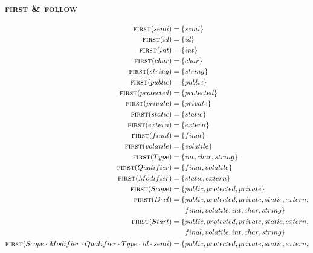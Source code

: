 \documentclass{report}
\newcommand{\Seq}{\cdot}
\newcommand{\FIRST}{\textsc{first}}
\newcommand{\FOLLOW}{\textsc{follow}}
\newcommand{\NT}[1]{{#1}}
\newcommand{\T}[1]{{#1}}
\begin{document}
    \subsubsection*{{\FIRST} \& {\FOLLOW}}
    \begin{equation*}
      \begin{aligned}
        \FIRST(\T{semi}) &= \{\T{semi}\}\\
        \FIRST(\T{id}) &= \{\T{id}\}\\
        \FIRST(\T{int}) &= \{\T{int}\}\\
        \FIRST(\T{char}) &= \{\T{char}\}\\
        \FIRST(\T{string}) &= \{\T{string}\}\\
        \FIRST(\T{public}) &= \{\T{public}\}\\
        \FIRST(\T{protected}) &= \{\T{protected}\}\\
        \FIRST(\T{private}) &= \{\T{private}\}\\
        \FIRST(\T{static}) &= \{\T{static}\}\\
        \FIRST(\T{extern}) &= \{\T{extern}\}\\
        \FIRST(\T{final}) &= \{\T{final}\}\\
        \FIRST(\T{volatile}) &= \{\T{volatile}\}\\
        \FIRST(\NT{Type}) &= \{\T{int}, \T{char}, \T{string}\} \\
        \FIRST(\NT{Qualifier}) &= \{\T{final}, \T{volatile}\}\\
        \FIRST(\NT{Modifier}) &= \{\T{static}, \T{extern}\}\\
        \FIRST(\NT{Scope}) &= \{\T{public}, \T{protected}, \T{private}\}\\
        \FIRST(\NT{Decl}) &= \begin{aligned}[t]\{&\T{public}, \T{protected}, \T{private}, \T{static}, \T{extern},\\
        &\T{final}, \T{volatile}, \T{int}, \T{char}, \T{string}\}\end{aligned}\\
        \FIRST(\NT{Start}) &= \begin{aligned}[t]\{&\T{public}, \T{protected}, \T{private}, \T{static}, \T{extern},\\
        &\T{final}, \T{volatile}, \T{int}, \T{char}, \T{string}\}\end{aligned}\\
        \FIRST(\NT{Scope} \Seq \NT{Modifier} \Seq \NT{Qualifier} \Seq \NT{Type} \Seq \T{id} \Seq \T{semi}) &= \begin{aligned}[t]\{&\T{public}, \T{protected}, \T{private}, \T{static}, \T{extern},\\

\end{aligned}
\end{aligned}
\end{equation*}
\end{document}
